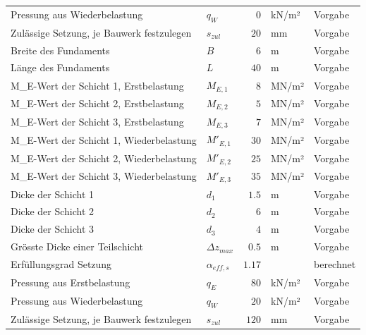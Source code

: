 \documentclass[11pt,a4paper]{article}
\begin{document}
\begin{xltabular}{\linewidth}{>{\raggedright\arraybackslash}Xlrll}
Pressung aus Wiederbelastung & $q_W$ & $0$ & kN/m² & Vorgabe \\
Zulässige Setzung, je Bauwerk festzulegen & $s_{zul}$ & $20$ & mm & Vorgabe \\
Breite des Fundaments & $B$ & $6$ & m & Vorgabe \\
Länge des Fundaments & $L$ & $40$ & m & Vorgabe \\
M\_E-Wert der Schicht 1, Erstbelastung & $M_{E,1}$ & $8$ & MN/m² & Vorgabe \\
M\_E-Wert der Schicht 2, Erstbelastung & $M_{E,2}$ & $5$ & MN/m² & Vorgabe \\
M\_E-Wert der Schicht 3, Erstbelastung & $M_{E,3}$ & $7$ & MN/m² & Vorgabe \\
M\_E-Wert der Schicht 1, Wiederbelastung & $M'_{E,1}$ & $30$ & MN/m² & Vorgabe \\
M\_E-Wert der Schicht 2, Wiederbelastung & $M'_{E,2}$ & $25$ & MN/m² & Vorgabe \\
M\_E-Wert der Schicht 3, Wiederbelastung & $M'_{E,3}$ & $35$ & MN/m² & Vorgabe \\
Dicke der Schicht 1 & $d_{1}$ & $1.5$ & m & Vorgabe \\
Dicke der Schicht 2 & $d_{2}$ & $6$ & m & Vorgabe \\
Dicke der Schicht 3 & $d_{3}$ & $4$ & m & Vorgabe \\
Grösste Dicke einer Teilschicht & $\Delta z_{max}$ & $0.5$ & m & Vorgabe \\
Erfüllungsgrad Setzung & $\alpha_{eff,s}$ & $1.17$ &  & berechnet \\
Pressung aus Erstbelastung & $q_E$ & $80$ & kN/m² & Vorgabe \\
Pressung aus Wiederbelastung & $q_W$ & $20$ & kN/m² & Vorgabe \\
Zulässige Setzung, je Bauwerk festzulegen & $s_{zul}$ & $120$ & mm & Vorgabe \\
\hline
\end{xltabular}
\end{document}

